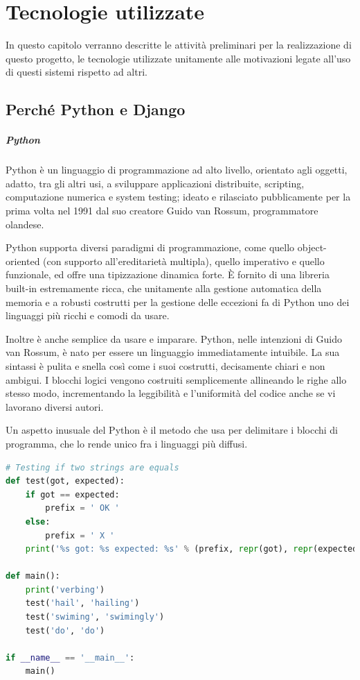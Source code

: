 \chapter{Tecnologie utilizzate}
In questo capitolo verranno descritte le attività preliminari per la realizzazione di questo progetto, le tecnologie utilizzate
unitamente alle motivazioni legate all'uso di questi sistemi rispetto ad altri.


\section{Perché Python e Django}
\paragraph{Python}
Python è un linguaggio di programmazione ad alto livello, orientato agli oggetti, adatto, tra gli altri usi, a sviluppare applicazioni 
distribuite, scripting, computazione numerica e system testing; ideato e rilasciato pubblicamente per la prima volta nel 1991 dal suo 
creatore Guido van Rossum, programmatore olandese.

Python supporta diversi paradigmi di programmazione, come quello object-oriented (con supporto all'ereditarietà multipla), quello 
imperativo e quello funzionale, ed offre una tipizzazione dinamica forte. È fornito di una libreria built-in estremamente ricca, che 
unitamente alla gestione automatica della memoria e a robusti costrutti per la gestione delle eccezioni fa di Python uno dei linguaggi 
più ricchi e comodi da usare.

Inoltre è anche semplice da usare e imparare. Python, nelle intenzioni di Guido van Rossum, è nato per essere un linguaggio 
immediatamente intuibile. La sua sintassi è pulita e snella così come i suoi costrutti, decisamente chiari e non ambigui. I blocchi 
logici vengono costruiti semplicemente allineando le righe allo stesso modo, incrementando la leggibilità e l'uniformità del codice 
anche se vi lavorano diversi autori.

Un aspetto inusuale del Python è il metodo che usa per delimitare i blocchi di programma, che lo rende unico fra i linguaggi più diffusi.

\lstset{style=python_code_style}
\begin{lstlisting}[language=Python, caption={Esempio di programma in Python}]
# Testing if two strings are equals
def test(got, expected):
	if got == expected:
		prefix = ' OK '
	else:
		prefix = ' X '
	print('%s got: %s expected: %s' % (prefix, repr(got), repr(expected)))

def main():
	print('verbing')
	test('hail', 'hailing')
	test('swiming', 'swimingly')
	test('do', 'do')

if __name__ == '__main__':
	main()
\end{lstlisting}

